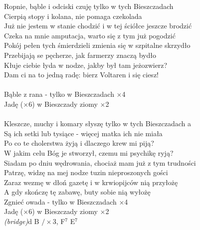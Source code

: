 \documentclass[a5paper, 10pt]{book}
\begin{document}
\begin{minipage}[t]{1\textwidth}
Ropnie, bąble i odciski czuję tylko w tych Bieszczadach\\
Cierpią stopy i kolana, nie pomaga czekolada\\
Już nie jestem w stanie chodzić i w tej ściółce jeszcze brodzić\\
Czeka na mnie amputacja, warto się z tym już pogodzić\\
\hspace*{3mm}Pokój pełen tych śmierdzieli zmienia się w szpitalne skrzydło\\
\hspace*{3mm}Przebijają se pęcherze, jak farmerzy znaczą bydło\\
\hspace*{3mm}Kłuje ciebie łyda w nodze, jakby był tam jeżozwierz?\\
\hspace*{3mm}Dam ci na to jedną radę: bierz Voltaren i się ciesz!\\
\\
\hspace*{10mm}Bąble z rana - tylko w Bieszczadach $\times$4\\
\hspace*{10mm}Jadę ($\times$6) w Bieszczady ziomy $\times$2\\
\\
Kleszcze, muchy i komary słyszę tylko w tych Bieszczadach a\\
Są ich setki lub tysiące - więcej matka ich nie miała\\
Po co te cholerstwa żyją i dlaczego krew mi piją?\\
W jakim celu Bóg je stworzył, czemu mi psychikę ryją?\\
\hspace*{3mm}Siadam po dniu wędrowania, chociaż mam już z tym trudności\\
\hspace*{3mm}Patrzę, widzę na mej nodze tuzin nieproszonych gości\\
\hspace*{3mm}Zaraz wezmę w dłoń gazetę i w krwiopijców nią przyłożę\\
\hspace*{3mm}A gdy skończę tę zabawę, buty sobie nią wyłożę\\

\hspace*{10mm}Zgnieć owada - tylko w Bieszczadach $\times$4\\
\hspace*{10mm}Jadę ($\times$6) w Bieszczady ziomy $\times$2\\

\textit{(bridge)}\hfill d B $/ \times$3, 
F$^7$ E$^7$\\
\end{minipage}
\end{document}
